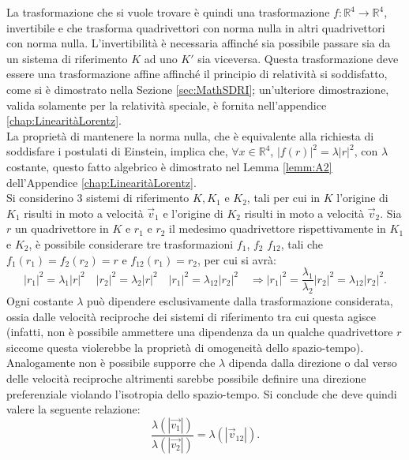 La trasformazione che si vuole trovare è quindi una trasformazione $f:\mathbb{R}^4\rightarrow\mathbb{R}^4$, invertibile e che trasforma quadrivettori con norma nulla in altri quadrivettori con norma nulla. L'invertibilità è necessaria affinché sia possibile passare sia da un sistema di riferimento $K$ ad uno $K'$ sia viceversa. Questa trasformazione deve essere una trasformazione affine affinché il principio di relatività si soddisfatto, come si è dimostrato nella Sezione \ref{sec:MathSDRI}; un'ulteriore dimostrazione, valida solamente per la relatività speciale, è fornita nell'appendice \ref{chap:LinearitàLorentz}.\\
La proprietà di mantenere la norma nulla, che è equivalente alla richiesta di soddisfare i postulati di Einstein, implica che, $\forall x\in\mathbb{R}^4$, $|f(r)|^2=\lambda |r|^2$, con $\lambda$ costante, questo fatto algebrico è dimostrato nel Lemma \ref{lemm:A2} dell'Appendice \ref{chap:LinearitàLorentz}.\\ Si considerino $3$ sistemi di riferimento $ K, K_1$ e $K_2$, tali per cui in $K$ l'origine di $K_1$ risulti in moto a velocità $\vec{v}_1$ e l'origine di $K_2$ risulti in moto a velocità $\vec{v}_2$. Sia $r$ un quadrivettore in $K$ e $r_1$ e $r_2$ il medesimo quadrivettore rispettivamente in $K_1$ e $K_2$, è possibile considerare tre trasformazioni $f_1$, $f_2$ $f_{12}$, tali che $f_1(r_1)=f_2(r_2)=r$ e $f_{12}(r_1)=r_2$, per cui si avrà:
\begin{equation*}
    |r_1|^2=\lambda_1 |r|^2 \quad |r_2|^2=\lambda_2 |r|^2 \quad |r_1|^2=\lambda_{12} |r_2|^2 \quad  \Rightarrow |r_1|^2=\frac{\lambda_1}{\lambda_2}|r_2|^2=\lambda_{12}|r_2|^2.
\end{equation*}
Ogni costante $\lambda$ può dipendere esclusivamente dalla trasformazione considerata, ossia dalle velocità reciproche dei sistemi di riferimento tra cui questa agisce (infatti, non è possibile ammettere una dipendenza da un qualche quadrivettore $r$ siccome questa violerebbe la proprietà di omogeneità dello spazio-tempo). Analogamente non è possibile supporre che $\lambda$ dipenda dalla direzione o dal verso delle velocità reciproche altrimenti sarebbe possibile definire una direzione preferenziale violando l'isotropia dello spazio-tempo. Si conclude che deve quindi valere la seguente relazione:
\begin{equation}
    \frac{\lambda(|\vec{v_1}|)}{\lambda(|\vec{v_2}|)}=\lambda(|\vec{v}_{12}|).
    \label{fraclambda}
\end{equation} 
